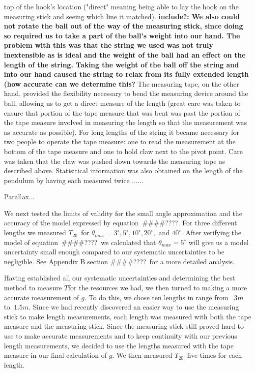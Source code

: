 \documentclass[iop,numberedappendix,appendixfloats]{emulateapj}
\def\g{$g$}
\def\T{$T$}
\def\Ttwen{$T_{20}$}
\def\fillin{\#\#\#\#????}
\def\deg{^{\circ}}
\begin{document}
{top of the hook's location ("direct" meaning being able to lay the hook on the 
measuring stick and seeing which line it matched). {\bf include?:  We also could not rotate 
the ball out of the way of the measuring stick, since doing so required us to 
take a part of the ball's weight into our hand.  The problem with this was 
that the string we used was not truly inextensible as is ideal and the weight 
of the ball had an effect on the length of the string.  Taking the weight of 
the ball off the string and into our hand caused the string to relax from its 
fully extended length (how accurate can we determine this?}  The measuring 
tape, on the other hand, provided the flexibility necessary to bend the 
measuring device around the ball, allowing us to get a direct measure of the 
length (great care was taken to ensure that portion of the tape measure that 
was bent was past the portion of the tape measure involved in measuring the 
length so that the measurement was as accurate as possible). For long lengths 
of the string it became necessary for two people to operate the tape measure:
one to read the measurement at the bottom of the tape measure and one to hold 
claw next to the pivot point.  Care was taken that the claw was pushed down 
towards the measuring tape as described above.  Statisitical information was 
also obtained on the length of the pendulum by having each measured twice
......%

Parallax...

We next tested the limits of validity for the small angle approximation and 
the accuracy of the model expressed by equation~\fillin. %
For three different lengths we measured \Ttwen\ for $\theta_{max} = 3\deg, 
5\deg, 10\deg, 20\deg,$ and $40\deg$.  %
After verifying the model of equation~\fillin\ we calculated that 
$\theta_{max}=5\deg$ will give us a model uncertainty small enough compared 
to our systematic uncertainties to be negligible.  See Appendix B section 
\fillin\ for a more detailed analysis.

Having established all our systematic uncertainties and determining the best 
method to measure \T for the resources we had, we then turned to making a more 
accurate measurement of \g.  To do this, we chose ten lengths in range from 
$~.3m$ to $~1.5m$.  Since we had recently discovered an easier way to use the 
measuring stick to make length measurements, each length was measured with 
both the tape measure and the measuring stick.  Since the measuring stick 
still proved hard to use to make accurate measurements and to keep continuity 
with our previous length measurements, we decided to use the lengths measured 
with the tape measure in our final calculation of \g. We then measured 
\Ttwen\ five times for each length.  

}
\end{document}
